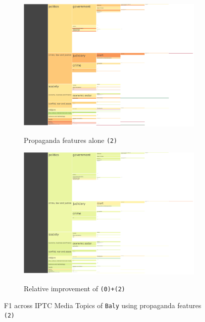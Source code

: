 \begin{figure}[!htbp]
    \centering
	\begin{subfigure}{0.49\textwidth}
            \centering
    \href{https://martinomensio.github.io/phd-project/figures/baly_iptc_weighted_f1_media_propaganda_percentages.html}{\includegraphics[trim={2.65cm 0cm 2.8cm 0cm},clip,width=\linewidth]{figures/baly_iptc_weighted_f1_media_propaganda_percentages.pdf}}
    \caption{Propaganda features alone \texttt{(2)}}
    \label{fig:baly_iptc_weighted_f1_media_propaganda_percentages}
\end{subfigure}
\begin{subfigure}{0.49\textwidth}
            \centering
    \href{https://martinomensio.github.io/phd-project/figures/baly_iptc_weighted_f1_media_delta.html}{\includegraphics[trim={2.65cm 0cm 2.8cm 0cm},clip,width=\linewidth]{figures/baly_iptc_weighted_f1_media_delta.pdf}}
    \caption{Relative improvement of \texttt{(0)+(2)}}
    \label{fig:baly_iptc_weighted_f1_media_delta}
\end{subfigure}
\caption{F1 across IPTC Media Topics of \texttt{Baly} using propaganda features \texttt{(2)}}
    \label{fig:baly_iptc_weighted_f1_media_prop}
\end{figure}


